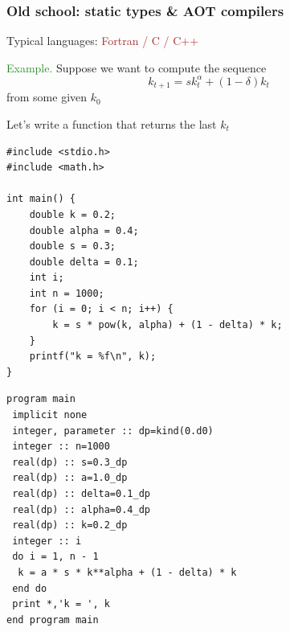 \documentclass[
    xcolor={svgnames,dvipsnames},
    hyperref={colorlinks, citecolor=DeepPink4, linkcolor=DarkRed, urlcolor=DarkBlue}
    ]{beamer}  %
\newcommand{\Eg}{\textcolor{ForestGreen}{Example. }}
\newcommand{\brown}[1]{\textcolor{Brown}{\sf #1}}
\newcommand{\1}{\mathbbm 1}
\begin{document}
\begin{frame}
    \frametitle{Old school: static types \& AOT compilers}

    Typical languages: \brown{Fortran / C / C++ }

        \vspace{0.5em}
        \vspace{0.5em}
    \Eg Suppose we want to compute the sequence
    \begin{equation*}
        k_{t+1} = s k_t^\alpha + (1 - \delta) k_t
    \end{equation*}
    from some given $k_0$ 

        \vspace{0.5em}
        \vspace{0.5em}

    Let's write a function that returns the last $k_t$


\end{frame}


\begin{frame}[fragile]
    
    \begin{verbatim}
#include <stdio.h>
#include <math.h>

int main() {
    double k = 0.2;
    double alpha = 0.4;
    double s = 0.3;
    double delta = 0.1;
    int i;
    int n = 1000;
    for (i = 0; i < n; i++) {
        k = s * pow(k, alpha) + (1 - delta) * k;
    }
    printf("k = %f\n", k);
}
    \end{verbatim}

\end{frame}




\begin{frame}[fragile]
    
    \begin{verbatim}
program main
 implicit none
 integer, parameter :: dp=kind(0.d0)                          
 integer :: n=1000
 real(dp) :: s=0.3_dp
 real(dp) :: a=1.0_dp
 real(dp) :: delta=0.1_dp
 real(dp) :: alpha=0.4_dp
 real(dp) :: k=0.2_dp
 integer :: i
 do i = 1, n - 1                                                
  k = a * s * k**alpha + (1 - delta) * k
 end do
 print *,'k = ', k
end program main
    \end{verbatim}

\end{frame}
\end{document}
